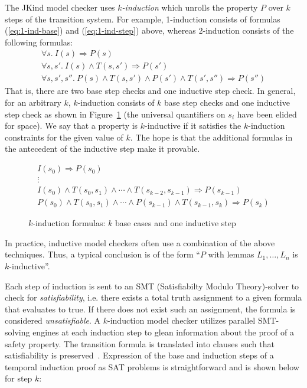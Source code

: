 The JKind model checker uses {\em
  $k$-induction} which unrolls the property $P$ over $k$ steps of the
transition system. For example, 1-induction consists of formulas (\ref{eq:1-ind-base}) and (\ref{eq:1-ind-step}) above, whereas 2-induction consists of the following formulas:
\begin{gather*}
\forall s.~ I(s) \Rightarrow P(s) \\
\forall s, s'.~ I(s) \land T(s, s') \Rightarrow P(s') \\
\forall s, s', s''.~ P(s) \land T(s, s') \land P(s') \land T(s',
  s'') \Rightarrow P(s'')
\end{gather*}
That is, there are two base step checks and one inductive step check.
In general, for an arbitrary $k$, $k$-induction consists of $k$
base step checks and one inductive step check as shown in
Figure~\ref{fig:k-induction} (the universal quantifiers on $s_i$ have
been elided for space). We say that a property is $k$-inductive if it
satisfies the $k$-induction constraints for the given value of $k$.
The hope is that the additional formulas in the antecedent of the
inductive step make it provable.

\begin{figure}
\begin{gather*}
I(s_0) \Rightarrow P(s_0) \\[-2pt]
%
\vdots \\[2pt]
%
I(s_0) \land T(s_0, s_1) \land \cdots \land T(s_{k-2}, s_{k-1})
\Rightarrow P(s_{k-1}) \\[2pt]
%
P(s_0) \land T(s_0, s_1) \land \cdots \land P(s_{k-1}) \land
T(s_{k-1}, s_k) \Rightarrow P(s_k)
\end{gather*}
\caption{$k$-induction formulas: $k$ base cases and one inductive
  step}
\label{fig:k-induction}
\end{figure}

In practice, inductive model checkers often use a combination of the
above techniques. Thus, a typical conclusion is of the form ``$P$ with
lemmas $L_1, \ldots, L_n$ is $k$-inductive''.

Each step of induction is sent to an SMT (Satisfiabilty Modulo Theory)-solver to check for \emph{satisfiability}, i.e. there exists a total truth assignment to a given formula that evaluates to true. If there does not exist such an assignment, the formula is considered \emph{unsatisfiable}. %
A $\mathit{k}$-induction model checker utilizes parallel SMT-solving engines at each induction step to glean information about the proof of a safety property. The transition formula is translated into clauses such that satisfiability is preserved~\cite{een2003temporal}. Expression of the base and induction steps of a temporal induction proof as SAT problems is straightforward and is shown below for step $k$:

